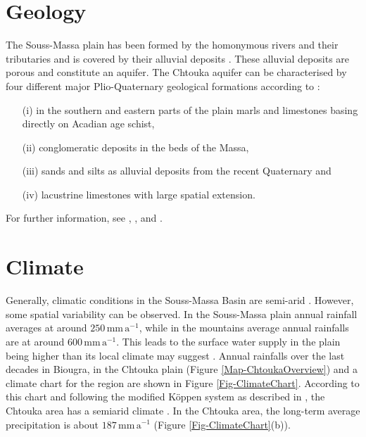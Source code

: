 \section{Geology}
\label{Sec-SouMaGeology}

The Souss-Massa plain has been formed by the homonymous rivers and their tributaries and is covered by their alluvial deposits \parencite{Hssaisoune.2017}. 
These alluvial deposits are porous and constitute an aquifer. 
The Chtouka aquifer can be characterised by four different major Plio-Quaternary geological formations according to \textcite{Malki.2017}: 
    \begin{itemize}
        \item[(i)] in the southern and eastern parts of the plain marls and limestones basing directly on Acadian age schist, 
        \item[(ii)] conglomeratic deposits in the beds of the Massa, 
        \item[(iii)] sands and silts as alluvial deposits from the recent Quaternary and
        \item[(iv)] lacustrine limestones with large spatial extension.
    \end{itemize}
For further information, see \cite{Choubert.1964}, \cite{Hssaisoune.2017}, \cite{Horn.2021} and \cite{Krimissa.2004}.

\section{Climate}
\label{Sec-SouMaClimate}

Generally, climatic conditions in the Souss-Massa Basin are semi-arid \parencite{Choukr.2017}. 
However, some spatial variability can be observed. 
In the Souss-Massa plain annual rainfall averages at around $250 \, \textrm{mm} \, \textrm{a}^{-1}$, while in the mountains average annual rainfalls are at around $600 \, \textrm{mm} \, \textrm{a}^{-1}$. 
This leads to the surface water supply in the plain being higher than its local climate may suggest \parencite{Hssaisoune.2017}. 
Annual rainfalls over the last decades in Biougra, in the Chtouka plain (Figure \ref{Map-ChtoukaOverview}) and a climate chart for the region are shown in Figure \ref{Fig-ClimateChart}. 
According to this chart and following the modified Köppen system as described in \cite{Critchfield.1983}, the Chtouka area has a semiarid climate \parencite{Choukr.2017}. 
In the Chtouka area, the long-term average precipitation is about $ 187 \, \textrm{mm} \, \textrm{a}^{-1}$ (Figure \ref{Fig-ClimateChart}(b)).

